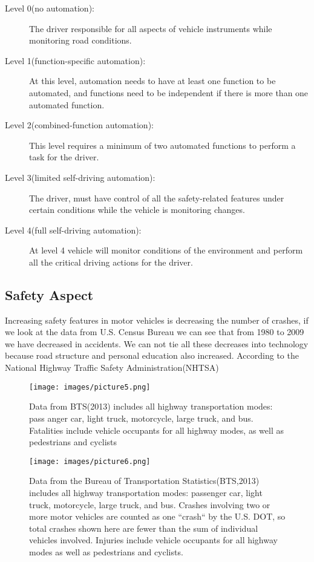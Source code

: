 \documentclass[sigconf]{acmart}
\begin{document}
\begin{description}
    \item[Level 0(no automation):] The driver responsible for all aspects of vehicle instruments while monitoring road con\-di\-ti\-ons.\cite{hamzah}
    \item[Level 1(function-specific automation):] At this level, automation needs to have at least one function to be automated, and functions need to be independent if there is more than one automated function. \cite{hamzah}
    \item[Level 2(combined-function automation):] This level re\-qu\-ir\-es a minimum of two automated functions to perform a task for the driver.\cite{hamzah}
    \item[Level 3(limited self-driving automation):] The driver, mu\-st have control of all the safety-related features under certain conditions while the vehicle is monitoring changes.\cite{hamzah}
    \item[Level 4(full self-driving automation):]At level 4 vehicle will monitor conditions of the environment and perform all the critical driving actions for the driver. \cite{hamzah}
\end{description}

\subsection{Safety Aspect}
Increasing safety features in motor vehicles is decreasing the number of crashes, if we look at the data from U.S. Census Bureau we can see that from 1980 to 2009 we have decreased in accidents. We can not tie all these decreases into technology because road structure and personal education also increased. According to the National Highway Traffic Safety Administration(NHTSA)
 
 \begin{figure}[!ht]
  \centering
      \texttt{[image: images/picture5.png]}
  \caption{Data from BTS(2013) includes all highway transportation modes: pass anger car, light truck, motorcycle, large truck, and bus. Fatalities include vehicle occupants for all highway modes, as well as pedestrians and cyclists}\label{fig:NHTSAaccidentreport}
\end{figure}

 \begin{figure}[!ht]
  \centering
      \texttt{[image: images/picture6.png]}
  \caption{Data from the Bureau of Transportation Statistics(BTS,2013) includes all highway transportation modes: passenger car, light truck, motorcycle, large truck, and bus. Crashes involving two or more motor vehicles are counted as one ``crash`` by the U.S. DOT, so total crashes shown  here are fewer than the sum of individual vehicles involved. Injuries include vehicle occupants for all highway modes as well as pedestrians and cyclists.}\label{fig:NHTSAaccidentreport2}
\end{figure}
\end{document}
